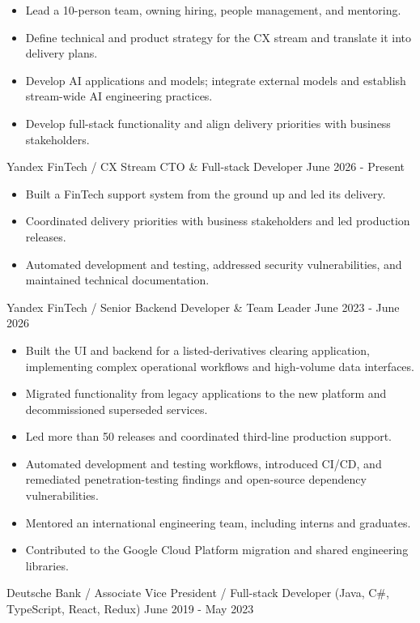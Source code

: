 
\begin{cventries}
\cventry
{
\vspace{-0.4cm}
\begin{itemize}
\item Lead a 10-person team, owning hiring, people management, and mentoring.
\item Define technical and product strategy for the CX stream and translate it into delivery plans.
\item Develop AI applications and models; integrate external models and establish stream-wide AI engineering practices.
\item Develop full-stack functionality and align delivery priorities with business stakeholders.
\end{itemize}
}
{Yandex FinTech / CX Stream CTO \& Full-stack Developer}
{}
{June 2026 - Present}

\vspace{-0.4cm}
\cventry
{
\vspace{-0.4cm}
\begin{itemize}
\item Built a FinTech support system from the ground up and led its delivery.
\item Coordinated delivery priorities with business stakeholders and led production releases.
\item Automated development and testing, addressed security vulnerabilities, and maintained technical documentation.
\end{itemize}
}
{Yandex FinTech / Senior Backend Developer \& Team Leader}
{}
{June 2023 - June 2026}

\vspace{-0.4cm}
\cventry
{
\vspace{-0.4cm}
\begin{itemize}
\item Built the UI and backend for a listed-derivatives clearing application, implementing complex operational workflows and high-volume data interfaces.
\item Migrated functionality from legacy applications to the new platform and decommissioned superseded services.
\item Led more than 50 releases and coordinated third-line production support.
\item Automated development and testing workflows, introduced CI/CD, and remediated penetration-testing findings and open-source dependency vulnerabilities.
\item Mentored an international engineering team, including interns and graduates.
\item Contributed to the Google Cloud Platform migration and shared engineering libraries.
\end{itemize}
}
{Deutsche Bank / Associate Vice President / Full-stack Developer (Java, C\#, TypeScript, React, Redux)}
{}
{June 2019 - May 2023}


\end{cventries}
